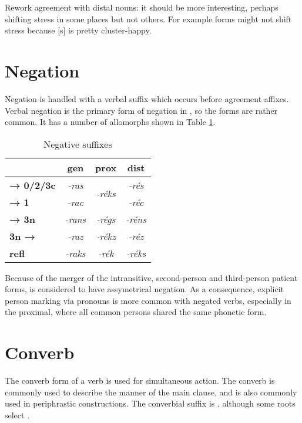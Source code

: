 \begin{kaobox}[frametitle=\sc todo:]
	Rework agreement with distal nouns: it should be more interesting, perhaps shifting stress in some places but not others. For example  forms might not shift stress because [s] is pretty cluster-happy.
\end{kaobox}

\section{Negation}
Negation is handled with a verbal suffix   which occurs before agreement affixes. Verbal negation is the primary form of negation in \langname{}, so the forms are rather common. It has a number of allomorphs shown in Table \ref{tab:negative_verb_suffixes}. 

\begin{table}[h] \centering
	\begin{tabular}{l|ccc}
		\toprule
		& \sc\bf gen & \sc\bf prox & \sc\bf dist \\ 
		\midrule
		\sc\bf → 0/2/3c & \rzc\it -ras & \multirow{2}{*}{\rzc\it -réks} & \rzc\it -rés \\
		\sc\bf → 1 & \rzc\it -rac & & \rzc\it -réc \\
		\sc\bf → 3n & \rzc\it -rans & \rzc\it -régs & \rzc\it -réns \\
		\sc\bf 3n → & \rzc\it -raz & \rzc\it -rékz & \rzc\it -réz \\
		\sc\bf refl & \rzc\it -raks & \rzc\it -rék & \rzc\it -réks \\
		\bottomrule
	\end{tabular}
	\caption{Negative suffixes}
	\label{tab:negative_verb_suffixes}
\end{table}


Because of the merger of the intransitive, second-person and third-person patient forms, \langname{} is considered to have assymetrical negation. As a consequence, explicit person marking via pronouns is more common with negated verbs, especially in the proximal, where all common persons shared the same phonetic form. 

\section{Converb}
The converb form of a verb is used for simultaneous action. The converb is commonly used to describe the manner of the main clause, and is also commonly used in periphrastic constructions. The converbial suffix is , although some roots select .

